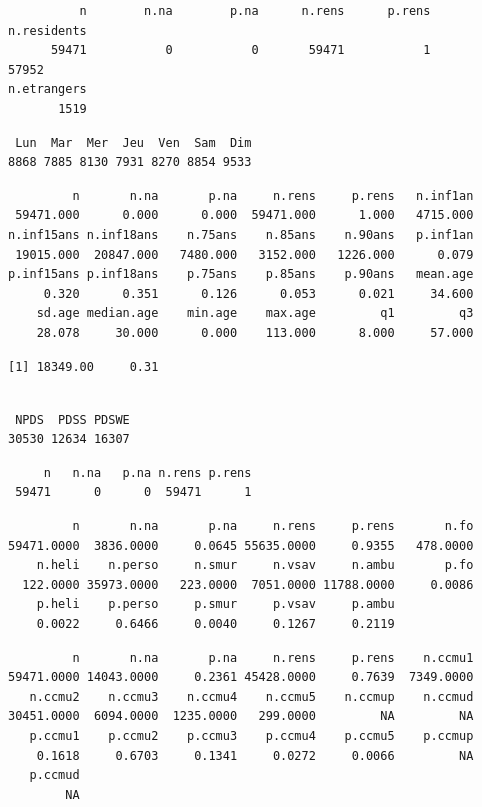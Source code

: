\documentclass[]{article}
\begin{document}
\begin{verbatim}
          n        n.na        p.na      n.rens      p.rens n.residents 
      59471           0           0       59471           1       57952 
n.etrangers 
       1519 
\end{verbatim}

\begin{verbatim}
 Lun  Mar  Mer  Jeu  Ven  Sam  Dim 
8868 7885 8130 7931 8270 8854 9533 
\end{verbatim}

\begin{verbatim}
         n       n.na       p.na     n.rens     p.rens   n.inf1an 
 59471.000      0.000      0.000  59471.000      1.000   4715.000 
n.inf15ans n.inf18ans    n.75ans    n.85ans    n.90ans   p.inf1an 
 19015.000  20847.000   7480.000   3152.000   1226.000      0.079 
p.inf15ans p.inf18ans    p.75ans    p.85ans    p.90ans   mean.age 
     0.320      0.351      0.126      0.053      0.021     34.600 
    sd.age median.age    min.age    max.age         q1         q3 
    28.078     30.000      0.000    113.000      8.000     57.000 
\end{verbatim}

\begin{verbatim}
[1] 18349.00     0.31
\end{verbatim}

\begin{verbatim}

 NPDS  PDSS PDSWE 
30530 12634 16307 
\end{verbatim}

\begin{verbatim}
     n   n.na   p.na n.rens p.rens 
 59471      0      0  59471      1 
\end{verbatim}

\begin{verbatim}
         n       n.na       p.na     n.rens     p.rens       n.fo 
59471.0000  3836.0000     0.0645 55635.0000     0.9355   478.0000 
    n.heli    n.perso     n.smur     n.vsav     n.ambu       p.fo 
  122.0000 35973.0000   223.0000  7051.0000 11788.0000     0.0086 
    p.heli    p.perso     p.smur     p.vsav     p.ambu 
    0.0022     0.6466     0.0040     0.1267     0.2119 
\end{verbatim}

\begin{verbatim}
         n       n.na       p.na     n.rens     p.rens    n.ccmu1 
59471.0000 14043.0000     0.2361 45428.0000     0.7639  7349.0000 
   n.ccmu2    n.ccmu3    n.ccmu4    n.ccmu5    n.ccmup    n.ccmud 
30451.0000  6094.0000  1235.0000   299.0000         NA         NA 
   p.ccmu1    p.ccmu2    p.ccmu3    p.ccmu4    p.ccmu5    p.ccmup 
    0.1618     0.6703     0.1341     0.0272     0.0066         NA 
   p.ccmud 
        NA 
\end{verbatim}
\end{document}
